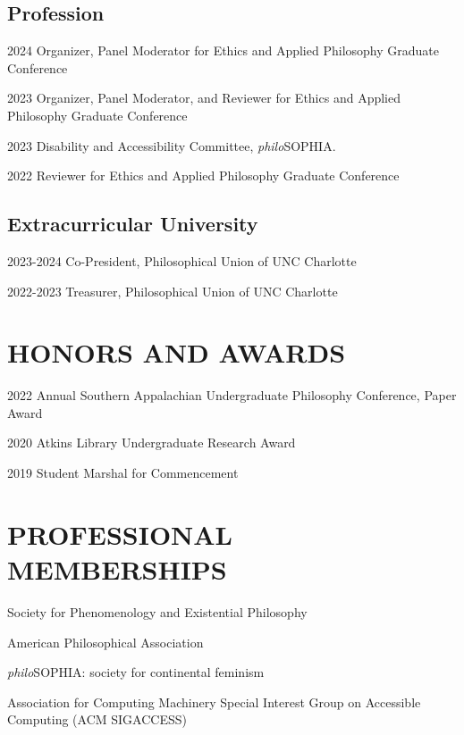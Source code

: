 \documentclass{article}
\newcommand{\listitemspace}{0.25em}
\renewenvironment{itemize}
{\begin{list}{}{\setlength{\leftmargin}{0em}
                \setlength{\parskip}{0em}
                \setlength{\itemsep}{\listitemspace}
                \setlength{\parsep}{\listitemspace}}}
{\end{list}}
\begin{document}
\subsection*{\normalsize{Profession}}
\begin{tablist}
    \item[2024] \tab{}Organizer, Panel Moderator for Ethics and Applied Philosophy Graduate Conference
    \item[2023] \tab{}Organizer, Panel Moderator, and Reviewer for Ethics and Applied Philosophy Graduate Conference
    \item[2023] \tab{}Disability and Accessibility Committee, \textit{philo}SOPHIA.
    \item[2022] \tab{}Reviewer for Ethics and Applied Philosophy Graduate Conference
\end{tablist}
\subsection*{\normalsize{Extracurricular University}}
\begin{tablist}
    \item[2023-2024] \tab{}Co-President, Philosophical Union of UNC Charlotte
    \item[2022-2023] \tab{}Treasurer, Philosophical Union of UNC Charlotte
\end{tablist}

\section*{\normalsize{\MakeUppercase{Honors and Awards}}}
\begin{tablist}
    \item[2022] \tab{} Annual Southern Appalachian Undergraduate Philosophy Conference, Paper Award
    \item[2020] \tab{}Atkins Library Undergraduate Research Award
    \item[2019] \tab{}Student Marshal for Commencement
\end{tablist}

\section*{\normalsize{\MakeUppercase{Professional Memberships}}}
\begin{itemize}
    \item Society for Phenomenology and Existential Philosophy
    \item American Philosophical Association
    \item \textit{philo}SOPHIA: society for continental feminism
    \item Association for Computing Machinery \textemdash{} Special Interest Group on Accessible Computing (ACM SIGACCESS)
\end{itemize}
\end{document}
